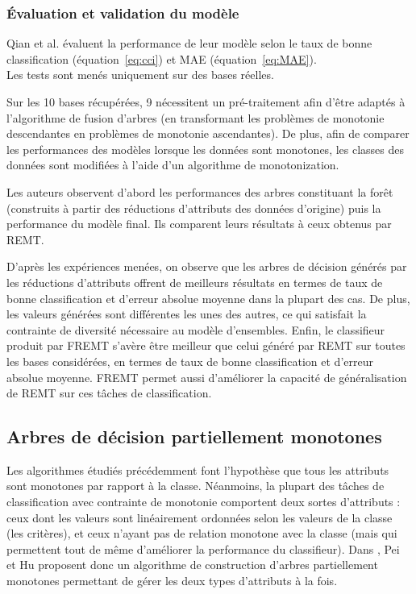 \documentclass[a4paper]{article}
\renewcommand{\eqref}[1]{équation~\ref{#1}}
\begin{document}
\subsubsection{Évaluation et validation du modèle}

Qian et al. \cite{qian-fusing} évaluent la performance de leur modèle selon le taux de bonne
classification (\eqref{eq:cci}) et MAE (\eqref{eq:MAE}). \\

Les tests sont menés uniquement sur des bases réelles.

\noindent Sur les 10 bases récupérées, 9 nécessitent un pré-traitement afin
d'être adaptés à l'algorithme de fusion d'arbres (en transformant les problèmes
de monotonie descendantes en problèmes de monotonie ascendantes). De plus, afin
de comparer les performances des modèles lorsque les données sont monotones, les
classes des données sont modifiées à l'aide d'un algorithme de monotonization.

\noindent Les auteurs observent d'abord les performances des arbres constituant
la forêt (construits à partir des réductions d'attributs des données d'origine)
puis la performance du modèle final. Ils comparent leurs résultats à ceux
obtenus par REMT.

\noindent D'après les expériences menées, on observe que les arbres de décision
générés par les réductions d'attributs offrent de meilleurs résultats en termes
de taux de bonne classification et d'erreur absolue moyenne dans la plupart des
cas. De plus, les valeurs générées sont différentes les unes des autres, ce qui
satisfait la contrainte de diversité nécessaire au modèle d'ensembles.
Enfin, le classifieur produit par FREMT s'avère être meilleur que
celui généré par REMT sur toutes les bases considérées, en termes de taux de
bonne classification et d'erreur absolue moyenne. FREMT permet aussi d'améliorer
la capacité de généralisation de REMT sur ces tâches de classification.


\subsection{Arbres de décision partiellement monotones} 

Les algorithmes étudiés précédemment font l'hypothèse que tous les attributs
sont monotones par rapport à la classe. Néanmoins, la plupart des tâches de
classification avec contrainte de monotonie comportent deux sortes d'attributs :
ceux dont les valeurs sont linéairement ordonnées selon les valeurs de la classe
(les critères), et ceux n'ayant pas de relation monotone avec la classe (mais
qui permettent tout de même d'améliorer la performance du classifieur). Dans
\cite{pei-partially}, Pei et Hu proposent donc un algorithme de construction
d'arbres partiellement monotones permettant de gérer les deux types d'attributs
à la fois. 
\end{document}
